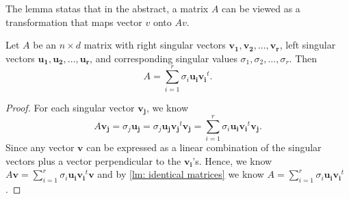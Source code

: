 \begin{note}
  The lemma statas that in the abstract, a matrix \(A\) can be viewed as a transformation that maps vector \(v\) onto \(Av\).   
\end{note}

\begin{theorem}\label{thm: SVD theorem}
  Let \(A\) be an \(n \times d\) matrix with right singular vectors \(\mathbf{v_1}, \mathbf{v_2}, \dots , \mathbf{v_r}   \), left singular vectors \(\mathbf{u_1}, \mathbf{u_2}, \dots , \mathbf{u_r}\), and corresponding singular values \(\sigma _1, \sigma _2, \dots , \sigma _r\). Then
  \[
    A= \sum_{i=1}^{r} \sigma _i \mathbf{u_i} \mathbf{v_i}^t.  
  \]  
\end{theorem}
\begin{proof}
  For each singular vector \(\mathbf{v_j} \), we know
  \[
    A \mathbf{v_j} = \sigma _j \mathbf{u_j}  = \sigma _j \mathbf{u_j} \mathbf{v_j}^t \mathbf{v_j} = \sum_{i=1}^{r} \sigma _i \mathbf{u_i} \mathbf{v_i}^t \mathbf{v_j}.    
  \] 
  Since any vector \(\mathbf{v} \) can be expressed as a linear combination of the singular vectors plus a vector perpendicular to the \(\mathbf{v_i} \)'s. Hence, we know \(A \mathbf{v} = \sum_{i=1}^{r} \sigma _i \mathbf{u_i} \mathbf{v_i}^t \mathbf{v}  \) and by \autoref{lm: identical matrices} we know \(A=\sum_{i=1}^{r} \sigma _i \mathbf{u_i} \mathbf{v_i}^t\). 
\end{proof}

